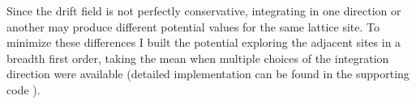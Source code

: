 \documentclass[a4paper]{article}
\begin{document}
Since the drift field is not perfectly conservative, integrating in one direction or another may produce different potential values for the same lattice site. To minimize these differences I built the potential exploring the adjacent sites in a breadth first order, taking the mean when multiple choices of the integration direction were available (detailed implementation can be found in the supporting code \cite{code}).
\begin{figure}
  \begin{minipage}[t]{0.7\linewidth}
  \end{minipage}
  \begin{minipage}[t]{0.27\linewidth}
  \\

\end{minipage}
\end{figure}
\end{document}
